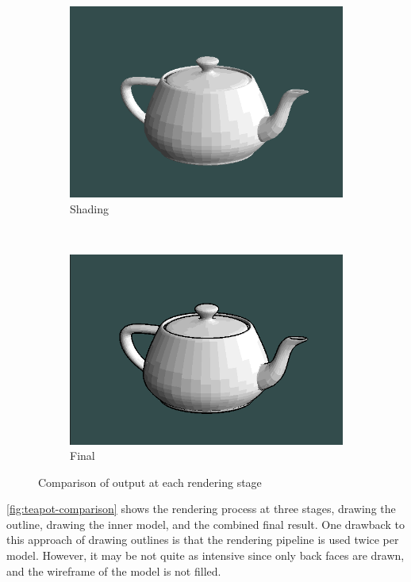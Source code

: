 \begin{figure}[h]
\begin{subfigure}[b]{0.2\textwidth}
        \includegraphics[width=\textwidth]{img/teapot-model.png}
        \caption{Shading}
        \label{fig:model-render}
    \end{subfigure}
    ~
    \begin{subfigure}[b]{0.2\textwidth}
        \includegraphics[width=\textwidth]{img/teapot-complete.png}
        \caption{Final}
        \label{fig:complete-render}
    \end{subfigure}
    \caption{Comparison of output at each rendering stage}
    \label{fig:teapot-comparison}
\end{figure}

\autoref{fig:teapot-comparison} shows the rendering process at three stages, drawing the outline,
drawing the inner model, and the combined final result. One drawback to this approach of drawing
outlines is that the rendering pipeline is used twice per model. However, it may be not quite as 
intensive since only back faces are drawn, and the wireframe of the model is not filled.
